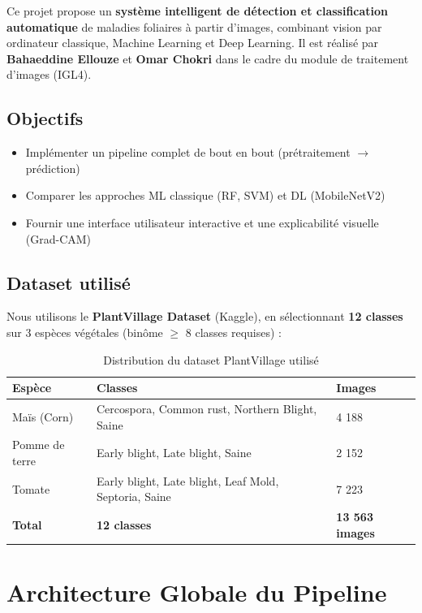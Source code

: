 \documentclass[12pt,a4paper]{article}
\begin{document}
Ce projet propose un \textbf{système intelligent de détection et classification automatique} 
de maladies foliaires à partir d'images, combinant vision par ordinateur classique, 
Machine Learning et Deep Learning. Il est réalisé par \textbf{Bahaeddine Ellouze} et 
\textbf{Omar Chokri} dans le cadre du module de traitement d'images (IGL4).

\subsection{Objectifs}
\begin{itemize}
  \item Implémenter un pipeline complet de bout en bout (prétraitement $\rightarrow$ prédiction)
  \item Comparer les approches ML classique (RF, SVM) et DL (MobileNetV2)
  \item Fournir une interface utilisateur interactive et une explicabilité visuelle (Grad-CAM)
\end{itemize}

\subsection{Dataset utilisé}
Nous utilisons le \textbf{PlantVillage Dataset} (Kaggle), en sélectionnant 
\textbf{12 classes} sur 3 espèces végétales (binôme $\geq$ 8 classes requises) :

\begin{table}[H]
\centering
\small
\begin{tabular}{lll}
\toprule
\textbf{Espèce} & \textbf{Classes} & \textbf{Images} \\
\midrule
Maïs (Corn) & Cercospora, Common rust, Northern Blight, Saine & 4 188 \\
Pomme de terre & Early blight, Late blight, Saine & 2 152 \\
Tomate & Early blight, Late blight, Leaf Mold, Septoria, Saine & 7 223 \\
\midrule
\textbf{Total} & \textbf{12 classes} & \textbf{13 563 images} \\
\bottomrule
\end{tabular}
\caption{Distribution du dataset PlantVillage utilisé}
\end{table}

\section{Architecture Globale du Pipeline}
\end{document}
